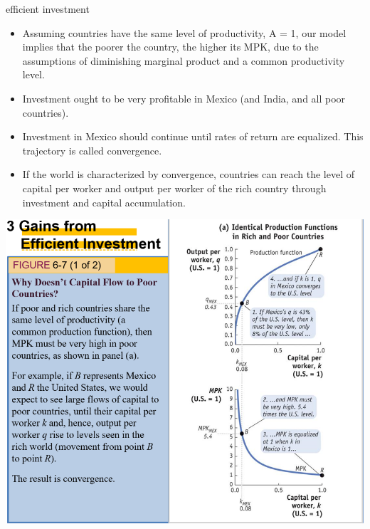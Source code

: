 \documentclass[
  ignorenonframetext,
]{beamer}
\providecommand{\tightlist}{%
  \setlength{\itemsep}{0pt}\setlength{\parskip}{0pt}}\usepackage{longtable,booktabs,array}
\begin{document}
\begin{frame}{efficient investment}
\label{efficient-investment-6}
\begin{itemize}
\tightlist
\item
  Assuming countries have the same level of productivity, A = 1, our
  model implies that the poorer the country, the higher its MPK, due to
  the assumptions of diminishing marginal product and a common
  productivity level.
\item
  Investment ought to be very profitable in Mexico (and India, and all
  poor countries).
\item
  Investment in Mexico should continue until rates of return are
  equalized. This trajectory is called convergence.
\item
  If the world is characterized by convergence, countries can reach the
  level of capital per worker and output per worker of the rich country
  through investment and capital accumulation.
\end{itemize}
\end{frame}

\begin{frame}
\includegraphics{Picture3.png}
\end{frame}
\end{document}
